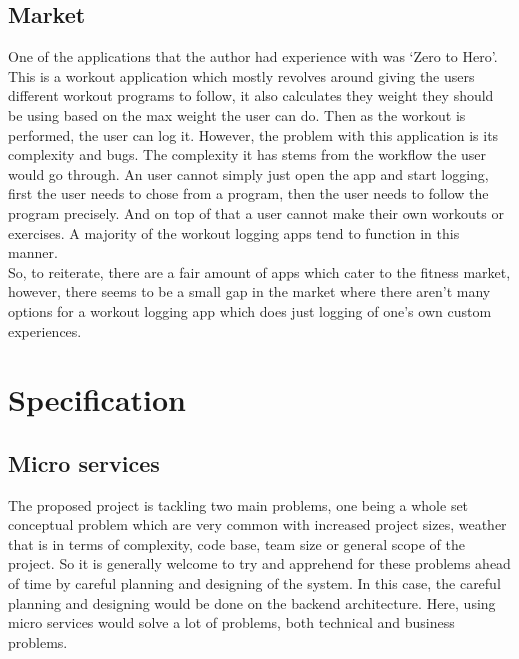 \documentclass{article}
\newcommand{\vspaceconst}{-2ex}
\begin{document}
\begin{multicols}{2}
\subsection{Market} %
\vspace{\vspaceconst}

One of the applications that the author had experience with was `Zero to Hero'\cite{zerotohero}. This is a workout application which mostly revolves around giving the users different workout programs to follow, it also calculates they weight they should be using based on the max weight the user can do. Then as the workout is performed, the user can log it. However, the problem with this application is its complexity and bugs. The complexity it has stems from the workflow the user would go through. An user cannot simply just open the app and start logging, first the user needs to chose from a program, then the user needs to follow the program precisely. And on top of that a user cannot make their own workouts or exercises. A majority of the workout logging apps tend to function in this manner.\\
So, to reiterate, there are a fair amount of apps which cater to the fitness market, however, there seems to be a small gap in the market where there aren't many options for a workout logging app which does just logging of one's own custom experiences.\\

\section{Specification}
\vspace{\vspaceconst}

\subsection{Micro services}
\vspace{\vspaceconst}

The proposed project is tackling two main problems, one being a whole set conceptual problem which are very common with increased project sizes, weather that is in terms of complexity, code base, team size or general scope of the project. So it is generally welcome to try and apprehend for these problems ahead of time by careful planning and designing of the system. In this case, the careful planning and designing would be done on the backend architecture. Here, using micro services would solve a lot of problems, both technical and business problems.\\


\end{multicols}
\end{document}
